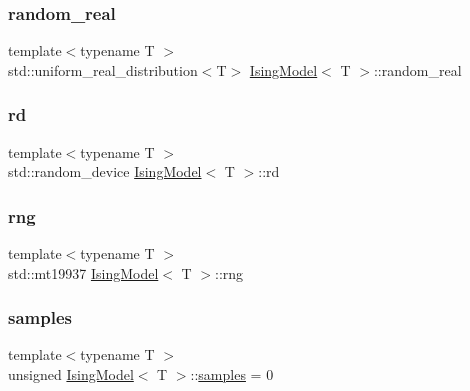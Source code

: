 \mbox{\label{classIsingModel_a01dcb867d89771158b7f71a518ded0f2}} 
\subsubsection{\texorpdfstring{random\+\_\+real}{random\_real}}
{\footnotesize\ttfamily template$<$typename T $>$ \\
std\+::uniform\+\_\+real\+\_\+distribution$<$T$>$ \mbox{\hyperlink{classIsingModel}{Ising\+Model}}$<$ T $>$\+::random\+\_\+real\hspace{0.3cm}{\ttfamily [private]}}

\mbox{\label{classIsingModel_a602475ebc23d97e2ba162ba1db352386}} 
\subsubsection{\texorpdfstring{rd}{rd}}
{\footnotesize\ttfamily template$<$typename T $>$ \\
std\+::random\+\_\+device \mbox{\hyperlink{classIsingModel}{Ising\+Model}}$<$ T $>$\+::rd\hspace{0.3cm}{\ttfamily [private]}}

\mbox{\label{classIsingModel_a3250275d0897da9f7929b43286e9b44b}} 
\subsubsection{\texorpdfstring{rng}{rng}}
{\footnotesize\ttfamily template$<$typename T $>$ \\
std\+::mt19937 \mbox{\hyperlink{classIsingModel}{Ising\+Model}}$<$ T $>$\+::rng\hspace{0.3cm}{\ttfamily [private]}}

\mbox{\label{classIsingModel_a434e854082ad794811b6e11e2bc50eaf}} 
\subsubsection{\texorpdfstring{samples}{samples}}
{\footnotesize\ttfamily template$<$typename T $>$ \\
unsigned \mbox{\hyperlink{classIsingModel}{Ising\+Model}}$<$ T $>$\+::\mbox{\hyperlink{glad_8h_aba70cd077c2c52c15358c231c6d293aa}{samples}} = 0\hspace{0.3cm}{\ttfamily [private]}}

